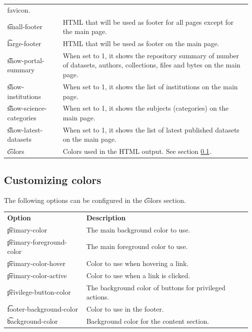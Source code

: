 \begin{tabularx}{\textwidth}{*{1}{!{\VRule[-1pt]}l}!{\VRule[-1pt]}X}
                                favicon.\\
  \t{small-footer}            & HTML that will be used as footer for all
                                pages except for the main page.\\
  \t{large-footer}            & HTML that will be used as footer on the
                                main page.\\
  \t{show-portal-summary}     & When set to 1, it shows the repository summary
                                of number of datasets, authors, collections,
                                files and bytes on the main page.\\
  \t{show-institutions}       & When set to 1, it shows the list of
                                institutions on the main page.\\
  \t{show-science-categories} & When set to 1, it shows the subjects
                                (categories) on the main page.\\
  \t{show-latest-datasets}    & When set to 1, it shows the list of latest
                                published datasets on the main page.\\
  \t{colors}                  & Colors used in the HTML output. See section
                                \ref{sec:customize-colors}.
\end{tabularx}

\subsection{Customizing colors}
\label{sec:customize-colors}

  The following options can be configured in the \t{colors} section.

\begin{tabularx}{\textwidth}{*{1}{!{\VRule[-1pt]}l}!{\VRule[-1pt]}X}
  \headrow
  \textbf{Option}              & \textbf{Description}\\
  \t{primary-color}            & The main background color to use.\\
  \t{primary-foreground-color} & The main foreground color to use.\\
  \t{primary-color-hover}      & Color to use when hovering a link.\\
  \t{primary-color-active}     & Color to use when a link is clicked.\\
  \t{privilege-button-color}   & The background color of buttons for
                                 privileged actions.\\
  \t{footer-background-color}  & Color to use in the footer.\\
  \t{background-color}         & Background color for the content section.
\end{tabularx}

